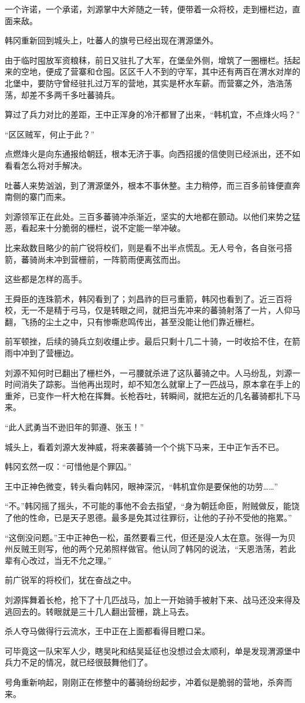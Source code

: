 一个许诺，一个承诺，刘源掌中大斧随之一转，便带着一众将校，走到栅栏边，直面来敌。

韩冈重新回到城头上，吐蕃人的旗号已经出现在渭源堡外。

由于临时囤放军资粮秣，前日又驻扎了大军，在堡垒外侧，增筑了一圈栅栏。括起来的空地，便成了营寨和仓囤。区区千人不到的守军，其中还有两百在渭水对岸的北堡中，要防守曾经驻扎过万军的营地，其实是杯水车薪。而营寨之外，浩浩荡荡，却差不多两千多吐蕃骑兵。

算过了兵力对比的差距，王中正浑身的冷汗都冒了出来，“韩机宜，不点烽火吗？”

“区区贼军，何止于此？”

点燃烽火是向东通报给朝廷，根本无济于事。向西招援的信使则已经派出，还不如看看怎么将对手解决。

吐蕃人来势汹汹，到了渭源堡外，根本不事休整。主力稍停，而三百多前锋便直奔南侧的寨门而来。

刘源领军正在此处。三百多蕃骑冲杀渐近，坚实的大地都在颤动。以他们来势之猛恶，看起来十分脆弱的栅栏，说不定能一举冲破。

比来敌数目略少的前广锐将校们，则是看不出半点慌乱。无人号令，各自张弓搭箭，蕃骑尚未冲到营栅前，一阵箭雨便离弦而出。

这些都是怎样的高手。

王舜臣的连珠箭术，韩冈看到了；刘昌祚的巨弓重箭，韩冈也看到了。近三百将校，无一不是精于弓马，仅是转眼之间，就把当先冲来的蕃骑射落了一片，人仰马翻，飞扬的尘土之中，只有惨嘶悲鸣传出，甚至没能让他们靠近栅栏。

前军顿挫，后续的骑兵立刻收缰止步。最后只剩十几二十骑，一时收拾不住，在箭雨中冲到了营栅边。

刘源不知何时已翻出了栅栏外，一弓腰就杀进了这队蕃骑之中。人马纷乱，刘源一时间消失了踪影。当他再出现时，却不知怎么就窜上了一匹战马，原本拿在手上的重斧，已变作一杆大枪在挥舞。长枪吞吐，转瞬间，就把左近的几名蕃骑都扎下马来。

“此人武勇当不逊旧年的郭遵、张玉！”

城头上，看着刘源大发神威，将来袭蕃骑一个个挑下马来，王中正乍舌不已。

韩冈玄然一叹：“可惜他是个罪囚。”

王中正神色微变，转头看向韩冈，眼神深沉，“韩机宜你是要保他的功劳……”

“不。”韩冈摇了摇头，不可能的事他不会去指望，“身为朝廷命臣，附贼做反，能饶了他的性命，已是天子恩德。最多是免其过往罪衍，让他的子孙不受他的拖累。”

“这倒没问题。”王中正神色一松，虽然要看三代，但还是没人太在意。张得一为贝州反贼王则写，他的两个兄弟照样做官。他认同了韩冈的说法，“天恩浩荡，若此辈有心改过，当无不允之理。”

前广锐军的将校们，犹在奋战之中。

刘源挥舞着长枪，抢下了十几匹战马，加上一开始骑手被射下来、战马还没来得及逃回去的。转眼就是三十几人翻出营栅，跳上马去。

杀人夺马做得行云流水，王中正在上面都看得目瞪口呆。

可毕竟这一队宋军人少，瞎吴叱和结吴延征也没想过会太顺利，单是发现渭源堡中兵力不足的情况，就已经很鼓舞他们了。

号角重新响起，刚刚正在修整中的蕃骑纷纷起步，冲着似是脆弱的营地，杀奔而来。

